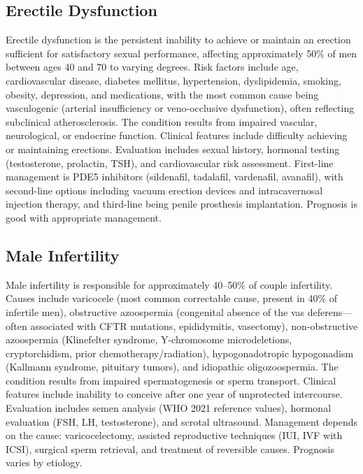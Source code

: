 \subsection{Erectile Dysfunction}
\label{sec:Erectile Dysfunction}
Erectile dysfunction is the persistent inability to achieve or maintain an erection sufficient for satisfactory sexual performance, affecting approximately 50\% of men between ages 40 and 70 to varying degrees. Risk factors include age, cardiovascular disease, diabetes mellitus, hypertension, dyslipidemia, smoking, obesity, depression, and medications, with the most common cause being vasculogenic (arterial insufficiency or veno-occlusive dysfunction), often reflecting subclinical atherosclerosis. The condition results from impaired vascular, neurological, or endocrine function. Clinical features include difficulty achieving or maintaining erections. Evaluation includes sexual history, hormonal testing (testosterone, prolactin, TSH), and cardiovascular risk assessment. First-line management is PDE5 inhibitors (sildenafil, tadalafil, vardenafil, avanafil), with second-line options including vacuum erection devices and intracavernosal injection therapy, and third-line being penile prosthesis implantation. Prognosis is good with appropriate management.

\subsection{Male Infertility}
\label{sec:Male Infertility}
Male infertility is responsible for approximately 40--50\% of couple infertility. Causes include varicocele (most common correctable cause, present in 40\% of infertile men), obstructive azoospermia (congenital absence of the vas deferens---often associated with CFTR mutations, epididymitis, vasectomy), non-obstructive azoospermia (Klinefelter syndrome, Y-chromosome microdeletions, cryptorchidism, prior chemotherapy/radiation), hypogonadotropic hypogonadism (Kallmann syndrome, pituitary tumors), and idiopathic oligozoospermia. The condition results from impaired spermatogenesis or sperm transport. Clinical features include inability to conceive after one year of unprotected intercourse. Evaluation includes semen analysis (WHO 2021 reference values), hormonal evaluation (FSH, LH, testosterone), and scrotal ultrasound. Management depends on the cause: varicocelectomy, assisted reproductive techniques (IUI, IVF with ICSI), surgical sperm retrieval, and treatment of reversible causes. Prognosis varies by etiology.

